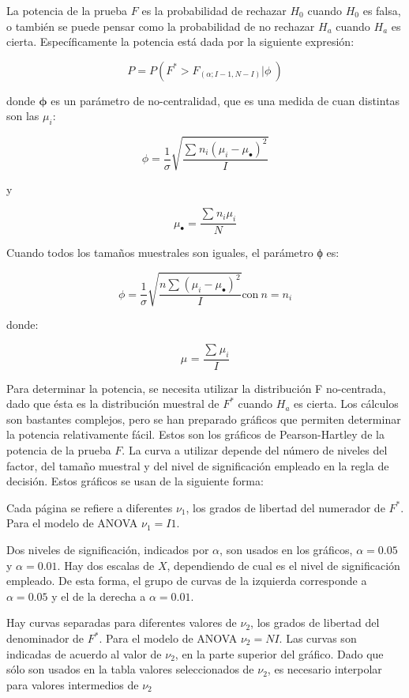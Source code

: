 \documentclass[]{book}
\theoremstyle{definition}
\theoremstyle{definition}
\theoremstyle{definition}
\theoremstyle{remark}
\begin{document}
La potencia de la prueba \(F\) es la probabilidad de rechazar \(H_{0}\)
cuando \(H_{0}\) es falsa, o también se puede pensar como la
probabilidad de no rechazar \(H_{a}\) cuando \(H_{a}\) es cierta.
Específicamente la potencia está dada por la siguiente expresión:

\[
P = P\left( F^{*} > F_{\left( \alpha;I - 1,N - I \right)}\left| \phi \right.\  \right)
\]

donde \(\mathbf{\phi}\) es un parámetro de no-centralidad, que es una
medida de cuan distintas son las \(\mu_i\):

\[
\phi = \frac{1}{\sigma}\sqrt{\frac{\sum_{}^{}{n_{i}\left( \mu_{i} - \mu_{\bullet} \right)^{2}}}{I}}
\]

y

\[
\mu_{\bullet} = \frac{\sum_{}^{}{n_{i}\mu_{i}}}{N}
\]

Cuando todos los tamaños muestrales son iguales, el parámetro ϕ es:

\[
\phi = \frac{1}{\sigma}\sqrt{\frac{n\sum_{}^{}\left( \mu_{i} - \mu_{\bullet} \right)^{2}}{I}}\text{con}\ n = n_{i}
\]

donde:

\[
\mu_{} = \frac{\sum_{}^{}\mu_{i}}{I}
\]

Para determinar la potencia, se necesita utilizar la distribución F
no-centrada, dado que ésta es la distribución muestral de \(F^{*}\)
cuando \(H_{a}\) es cierta. Los cálculos son bastantes complejos, pero
se han preparado gráficos que permiten determinar la potencia
relativamente fácil. Estos son los gráficos de Pearson-Hartley de la
potencia de la prueba \(F\). La curva a utilizar depende del número de
niveles del factor, del tamaño muestral y del nivel de significación
empleado en la regla de decisión. Estos gráficos se usan de la siguiente
forma:

Cada página se refiere a diferentes \(\nu_{1}\), los grados de libertad
del numerador de \(F^{*}\). Para el modelo de ANOVA \(\nu_{1} = I1\).

Dos niveles de significación, indicados por \(\alpha\), son usados en
los gráficos, \(\alpha = 0.05\) y \(\alpha = 0.01\). Hay dos escalas de
\(X\), dependiendo de cual es el nivel de significación empleado. De
esta forma, el grupo de curvas de la izquierda corresponde a
\(\alpha = 0.05\) y el de la derecha a \(\alpha = 0.01\).

Hay curvas separadas para diferentes valores de \(\nu_{2}\), los grados
de libertad del denominador de \(F^{*}\). Para el modelo de ANOVA
\(\nu_{2} = NI\). Las curvas son indicadas de acuerdo al valor de
\(\nu_{2}\), en la parte superior del gráfico. Dado que sólo son usados
en la tabla valores seleccionados de \(\nu_{2}\), es necesario
interpolar para valores intermedios de \(\nu_{2}\)
\end{document}
